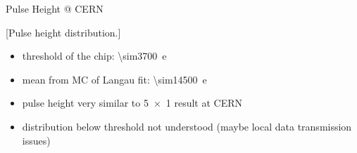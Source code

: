 \begin{frame}{Pulse Height @ CERN}

	\vspace*{-2ex}[Pulse height distribution.]\vspace*{-2ex}
	
	\begin{itemize}\itemfill
		\item threshold of the chip: \SI{\sim3700}{e}
		\item mean from MC of Langau fit: \SI{\sim14500}{e}
		\item pulse height very similar to \SI{5x1}{} result at CERN
		\item distribution below threshold not understood (maybe local data transmission issues)
	\end{itemize}
	
\end{frame}
